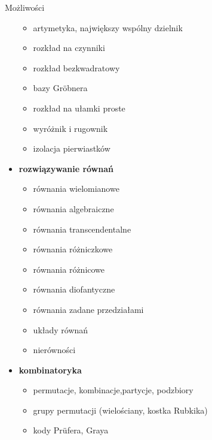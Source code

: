 \documentclass[10pt]{beamer}
\begin{document}
\begin{frame}{Możliwości}
\begin{multicols}{2}
\begin{itemize}
        \begin{itemize}
          \tiny
          \item artymetyka, największy wspólny dzielnik
          \item rozkład na czynniki
          \item rozkład bezkwadratowy
          \item bazy Gröbnera
          \item rozkład na ułamki proste
          \item wyróżnik i rugownik
          \item izolacja pierwiastków
        \end{itemize}
      \item \textbf{rozwiązywanie równań}
        \begin{itemize}
          \tiny
          \item równania wielomianowe
          \item równania algebraiczne
          \item równania transcendentalne
          \item równania różniczkowe
          \item równania różnicowe
          \item równania diofantyczne
          \item równania zadane przedziałami
          \item układy równań
          \item nierówności
        \end{itemize}
      \item \textbf{kombinatoryka}
        \begin{itemize}
          \tiny
          \item permutacje, kombinacje,partycje, podzbiory
          \item grupy permutacji (wielościany, kostka Rubkika)
          \item kody Prüfera, Graya
        \end{itemize}
    \end{itemize}
  \end{multicols}
\end{frame}
\end{document}
